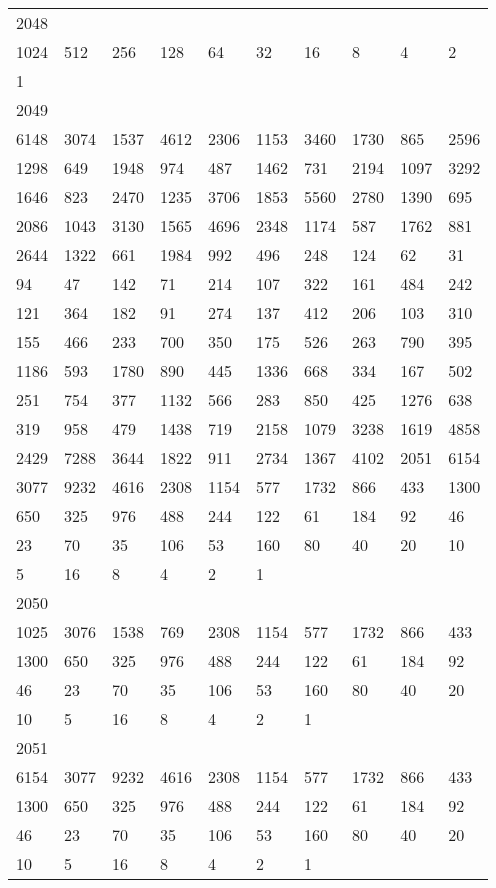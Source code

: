 \begin{longtable}{*{10}{l}}
2048&&&&&&&&&\\
1024& 512& 256& 128& 64& 32& 16& 8& 4& 2\\
1& \\

2049&&&&&&&&&\\
6148& 3074& 1537& 4612& 2306& 1153& 3460& 1730& 865& 2596\\
1298& 649& 1948& 974& 487& 1462& 731& 2194& 1097& 3292\\
1646& 823& 2470& 1235& 3706& 1853& 5560& 2780& 1390& 695\\
2086& 1043& 3130& 1565& 4696& 2348& 1174& 587& 1762& 881\\
2644& 1322& 661& 1984& 992& 496& 248& 124& 62& 31\\
94& 47& 142& 71& 214& 107& 322& 161& 484& 242\\
121& 364& 182& 91& 274& 137& 412& 206& 103& 310\\
155& 466& 233& 700& 350& 175& 526& 263& 790& 395\\
1186& 593& 1780& 890& 445& 1336& 668& 334& 167& 502\\
251& 754& 377& 1132& 566& 283& 850& 425& 1276& 638\\
319& 958& 479& 1438& 719& 2158& 1079& 3238& 1619& 4858\\
2429& 7288& 3644& 1822& 911& 2734& 1367& 4102& 2051& 6154\\
3077& 9232& 4616& 2308& 1154& 577& 1732& 866& 433& 1300\\
650& 325& 976& 488& 244& 122& 61& 184& 92& 46\\
23& 70& 35& 106& 53& 160& 80& 40& 20& 10\\
5& 16& 8& 4& 2& 1& \\

2050&&&&&&&&&\\
1025& 3076& 1538& 769& 2308& 1154& 577& 1732& 866& 433\\
1300& 650& 325& 976& 488& 244& 122& 61& 184& 92\\
46& 23& 70& 35& 106& 53& 160& 80& 40& 20\\
10& 5& 16& 8& 4& 2& 1& \\

2051&&&&&&&&&\\
6154& 3077& 9232& 4616& 2308& 1154& 577& 1732& 866& 433\\
1300& 650& 325& 976& 488& 244& 122& 61& 184& 92\\
46& 23& 70& 35& 106& 53& 160& 80& 40& 20\\
10& 5& 16& 8& 4& 2& 1& \\


\end{longtable}
